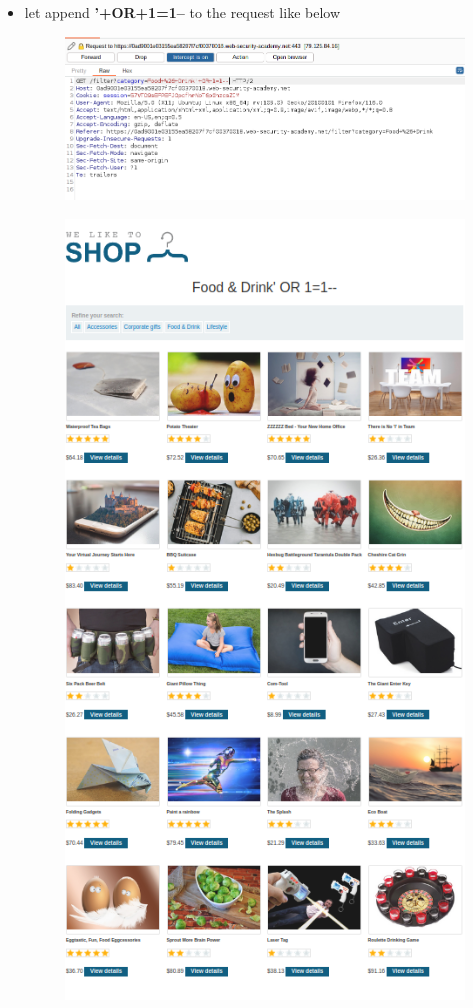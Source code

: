 \documentclass[
	a4paper, %
	12pt, %
]{CSSullivanBusinessReport}
\begin{document}
\begin{fullwidth}
\begin{itemize}
\begin{figure}[H]
    \end{figure}
    \item let append {\color{orange}\textbf{'+OR+1=1-- }} to the request like below
    \begin{figure}[H]
        \centering
        \includegraphics[width=1\linewidth]{sql_injection_in_intercept.png}
        
        
    \end{figure}
    \begin{figure}[H]
    \centering
    \includegraphics[width=0.7\linewidth]{Images//sql injection/result.png}
    

\end{figure}
\end{itemize}
\end{fullwidth}
\end{document}
